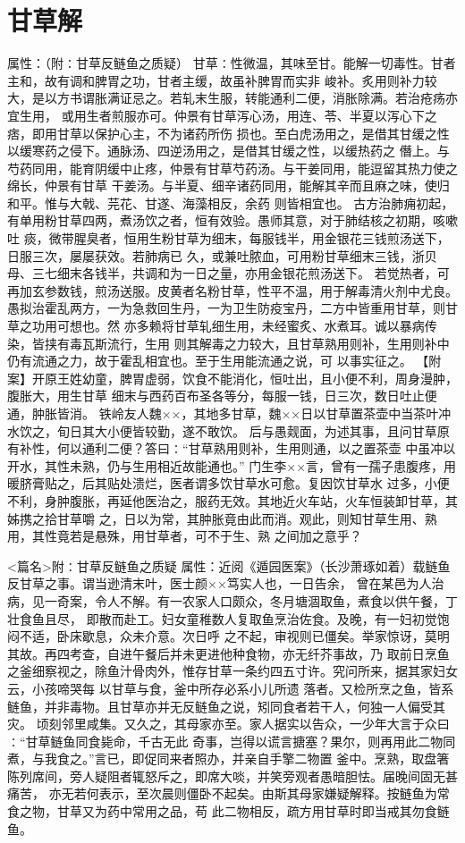 \documentclass[a4paper,12pt,UTF8,twoside]{ctexbook}
\begin{document}
\chapter{甘草解}
属性：（附∶甘草反鲢鱼之质疑） 
甘草∶性微温，其味至甘。能解一切毒性。甘者主和，故有调和脾胃之功，甘者主缓，故虽补脾胃而实非 
峻补。炙用则补力较大，是以方书谓胀满证忌之。若轧末生服，转能通利二便，消胀除满。若治疮疡亦宜生用， 
或用生者煎服亦可。仲景有甘草泻心汤，用连、苓、半夏以泻心下之痞，即用甘草以保护心主，不为诸药所伤 
损也。至白虎汤用之，是借其甘缓之性以缓寒药之侵下。通脉汤、四逆汤用之，是借其甘缓之性，以缓热药之 
僭上。与芍药同用，能育阴缓中止疼，仲景有甘草芍药汤。与干姜同用，能逗留其热力使之绵长，仲景有甘草 
干姜汤。与半夏、细辛诸药同用，能解其辛而且麻之味，使归和平。惟与大戟、芫花、甘遂、海藻相反，余药 
则皆相宜也。 
古方治肺痈初起，有单用粉甘草四两，煮汤饮之者，恒有效验。愚师其意，对于肺结核之初期，咳嗽吐 
痰，微带腥臭者，恒用生粉甘草为细末，每服钱半，用金银花三钱煎汤送下，日服三次，屡屡获效。若肺病已 
久，或兼吐脓血，可用粉甘草细末三钱，浙贝母、三七细末各钱半，共调和为一日之量，亦用金银花煎汤送下。 
若觉热者，可再加玄参数钱，煎汤送服。皮黄者名粉甘草，性平不温，用于解毒清火剂中尤良。 
愚拟治霍乱两方，一为急救回生丹，一为卫生防疫宝丹，二方中皆重用甘草，则甘草之功用可想也。然 
亦多赖将甘草轧细生用，未经蜜炙、水煮耳。诚以暴病传染，皆挟有毒瓦斯流行，生用 
则其解毒之力较大，且甘草熟用则补，生用则补中仍有流通之力，故于霍乱相宜也。至于生用能流通之说，可 
以事实征之。 
【附案】开原王姓幼童，脾胃虚弱，饮食不能消化，恒吐出，且小便不利，周身漫肿，腹胀大，用生甘草 
细末与西药百布圣各等分，每服一钱，日三次，数日吐止便通，肿胀皆消。 
铁岭友人魏××，其地多甘草，魏××日以甘草置茶壶中当茶叶冲水饮之，旬日其大小便皆较勤，遂不敢饮。 
后与愚觌面，为述其事，且问甘草原有补性，何以通利二便？答曰∶“甘草熟用则补，生用则通，以之置茶壶 
中虽冲以开水，其性未熟，仍与生用相近故能通也。” 
门生李××言，曾有一孺子患腹疼，用暖脐膏贴之，后其贴处溃烂，医者谓多饮甘草水可愈。复因饮甘草水 
过多，小便不利，身肿腹胀，再延他医治之，服药无效。其地近火车站，火车恒装卸甘草，其姊携之拾甘草嚼 
之，日以为常，其肿胀竟由此而消。观此，则知甘草生用、熟用，其性竟若是悬殊，用甘草者，可不于生、熟 
之间加之意乎？ 


<篇名>附∶甘草反鲢鱼之质疑
属性：近阅《遁园医案》（长沙萧琢如着）载鲢鱼反甘草之事。谓当逊清末叶，医士颜××笃实人也，一日告余， 
曾在某邑为人治病，见一奇案，令人不解。有一农家人口颇众，冬月塘涸取鱼，煮食以供午餐，丁壮食鱼且尽， 
即散而赴工。妇女童稚数人复取鱼烹治佐食。及晚，有一妇初觉饱闷不适，卧床歇息，众未介意。次日呼 
之不起，审视则已僵矣。举家惊讶，莫明其故。再四考查，自进午餐后并未更进他种食物，亦无纤芥事故，乃 
取前日烹鱼之釜细察视之，除鱼汁骨肉外，惟存甘草一条约四五寸许。究问所来，据其家妇女云，小孩啼哭每 
以甘草与食，釜中所存必系小儿所遗 
落者。又检所烹之鱼，皆系鲢鱼，并非毒物。且甘草亦并无反鲢鱼之说，矧同食者若干人，何独一人偏受其灾。 
顷刻邻里咸集。又久之，其母家亦至。家人据实以告众，一少年大言于众曰∶“甘草鲢鱼同食毙命，千古无此 
奇事，岂得以谎言搪塞？果尔，则再用此二物同煮，与我食之。”言已，即促同来者照办，并亲自手擎二物置 
釜中。烹熟，取盘箸陈列席间，旁人疑阻者辄怒斥之，即席大啖，并笑旁观者愚暗胆怯。届晚间固无甚痛苦， 
亦无若何表示，至次晨则僵卧不起矣。由斯其母家嫌疑解释。按鲢鱼为常食之物，甘草又为药中常用之品，苟 
此二物相反，疏方用甘草时即当戒其勿食鲢鱼。 
\end{document}
